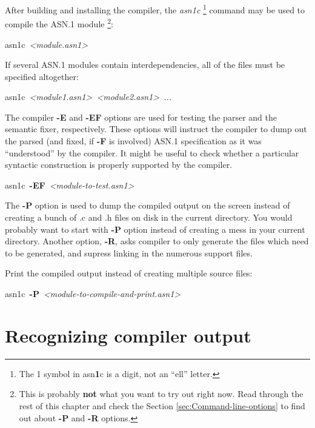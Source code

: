 \documentclass[english,oneside,12pt]{book}
\newenvironment{lyxcode}
{\par\begin{list}{}{
\setlength{\rightmargin}{\leftmargin}
\setlength{\listparindent}{0pt}%
\raggedright
\setlength{\itemsep}{0pt}
\setlength{\parsep}{0pt}
\normalfont\ttfamily}%
 \item[]}
{\end{list}}
\begin{document}
After building and installing the compiler, the \emph{asn1c}%
\footnote{The 1 symbol in asn\textbf{1}c is a digit, not an ``ell'' letter.%
} command may be used to compile the ASN.1 module%
\footnote{This is probably \textbf{not} what you want to try out right now. Read through the rest of this chapter and check the Section \vref{sec:Command-line-options}
to find out about \textbf{-P} and \textbf{-R} options.%
}:
\begin{lyxcode}
asn1c~\emph{<module.asn1>}
\end{lyxcode}
If several ASN.1 modules contain interdependencies, all of the files
must be specified altogether:
\begin{lyxcode}
asn1c~\emph{<module1.asn1>~<module2.asn1>~...}
\end{lyxcode}
The compiler \textbf{-E} and \textbf{-EF} options are used for testing
the parser and the semantic fixer, respectively. These options will
instruct the compiler to dump out the parsed (and fixed, if \textbf{-F}
is involved) ASN.1 specification as it was ``understood''
by the compiler. It might be useful to check whether a particular
syntactic construction is properly supported by the compiler.
\begin{lyxcode}
asn1c~\textbf{-EF}~\emph{<module-to-test.asn1>}
\end{lyxcode}
The \textbf{-P} option is used to dump the compiled output on the
screen instead of creating a bunch of .c and .h files on disk in the
current directory. You would probably want to start with \textbf{-P}
option instead of creating a mess in your current directory. Another
option, \textbf{-R}, asks compiler to only generate the files which
need to be generated, and supress linking in the numerous support
files.

Print the compiled output instead of creating multiple source files:
\begin{lyxcode}
asn1c~\textbf{-P}~\emph{<module-to-compile-and-print.asn1>}
\end{lyxcode}

\section{Recognizing compiler output}
\end{document}
